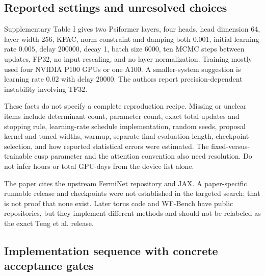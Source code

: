 \documentclass[11pt,letterpaper]{article}
\begin{document}
\subsection{Reported settings and unresolved choices}

Supplementary Table I gives two Psiformer layers, four heads, head dimension 64, layer width 256, KFAC, norm constraint and damping both $0.001$, initial learning rate $0.005$, delay $200000$, decay 1, batch size 6000, ten MCMC steps between updates, FP32, no input rescaling, and no layer normalization. Training mostly used four NVIDIA P100 GPUs or one A100. A smaller-system suggestion is learning rate $0.02$ with delay $20000$. The authors report precision-dependent instability involving TF32.

These facts do not specify a complete reproduction recipe. Missing or unclear items include determinant count, parameter count, exact total updates and stopping rule, learning-rate schedule implementation, random seeds, proposal kernel and tuned widths, warmup, separate final-evaluation length, checkpoint selection, and how reported statistical errors were estimated. The fixed-versus-trainable cusp parameter and the attention convention also need resolution. Do not infer hours or total GPU-days from the device list alone.

The paper cites the upstream FermiNet repository and JAX. A paper-specific runnable release and checkpoints were not established in the targeted search; that is not proof that none exist. Later torus code and WF-Bench have public repositories, but they implement different methods and should not be relabeled as the exact Teng et al. release.\cite{ferminetcode,fadoncoderef,wfbenchcode}

\subsection{Implementation sequence with concrete acceptance gates}
\end{document}
